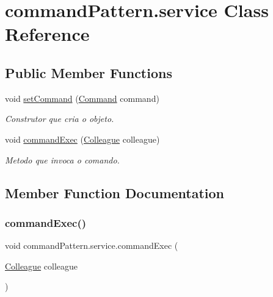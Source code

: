 \hypertarget{classcommand_pattern_1_1service}{}\section{command\+Pattern.\+service Class Reference}
\label{classcommand_pattern_1_1service}
\subsection*{Public Member Functions}
\begin{DoxyCompactItemize}
\item 
void \mbox{\hyperlink{classcommand_pattern_1_1service_a126704d575df711cb8abb7e03b7f0ce8}{set\+Command}} (\mbox{\hyperlink{interfacecommand_pattern_1_1_command}{Command}} command)
\begin{DoxyCompactList}\small\item\em Construtor que cria o objeto. \end{DoxyCompactList}\item 
void \mbox{\hyperlink{classcommand_pattern_1_1service_ab77a00371311812768ce461467bf8f9c}{command\+Exec}} (\mbox{\hyperlink{classmediator_pattern_1_1_colleague}{Colleague}} colleague)
\begin{DoxyCompactList}\small\item\em Metodo que invoca o comando. \end{DoxyCompactList}\end{DoxyCompactItemize}


\subsection{Member Function Documentation}
\mbox{\label{classcommand_pattern_1_1service_ab77a00371311812768ce461467bf8f9c}} 
\subsubsection{\texorpdfstring{commandExec()}{commandExec()}}
{\footnotesize\ttfamily void command\+Pattern.\+service.\+command\+Exec (\begin{DoxyParamCaption}\item[{\mbox{\hyperlink{classmediator_pattern_1_1_colleague}{Colleague}}}]{colleague }\end{DoxyParamCaption})}



